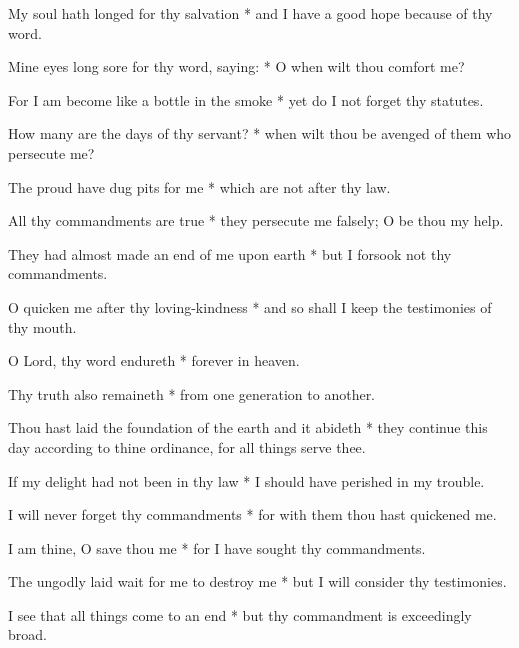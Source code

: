 My soul hath longed for thy salvation * and I have a good hope because of thy word.

Mine eyes long sore for thy word, saying: * O when wilt thou comfort me?

For I am become like a bottle in the smoke * yet do I not forget thy statutes.

How many are the days of thy servant? * when wilt thou be avenged of them who persecute me?

The proud have dug pits for me * which are not after thy law.

All thy commandments are true * they persecute me falsely; O be thou my help.

They had almost made an end of me upon earth * but I forsook not thy commandments.

O quicken me after thy loving-kindness * and so shall I keep the testimonies of thy mouth.

O Lord, thy word endureth * forever in heaven.

Thy truth also remaineth * from one generation to another.

Thou hast laid the foundation of the earth and it abideth * they continue this day according to thine ordinance, for all things serve thee.

If my delight had not been in thy law * I should have perished in my trouble.

I will never forget thy commandments * for with them thou hast quickened me.

I am thine, O save thou me * for I have sought thy commandments.

The ungodly laid wait for me to destroy me * but I will consider thy testimonies.

I see that all things come to an end * but thy commandment is exceedingly broad.